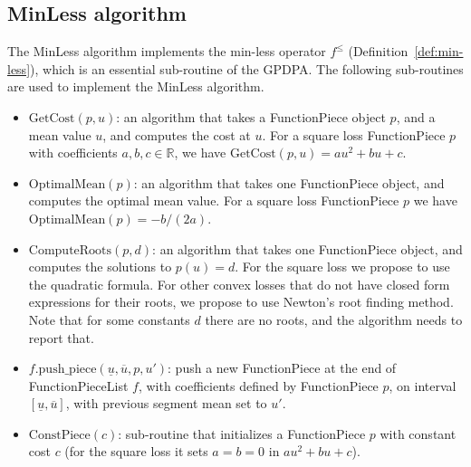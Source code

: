 \documentclass{article}
\newcommand{\RR}{\mathbb R}
\begin{document}
\subsection{MinLess algorithm}
\label{sec:MinLess}
The MinLess algorithm implements the min-less operator $f^\leq$
(Definition~\ref{def:min-less}), which is an essential sub-routine of
the GPDPA. The following sub-routines are used to implement the
MinLess algorithm.

\begin{itemize}
\item $\text{GetCost}(p, u)$: an algorithm that takes a FunctionPiece
  object $p$, and a mean value $u$, and computes the cost at $u$. For
  a square loss FunctionPiece $p$ with coefficients $a,b,c\in\RR$, we
  have $\text{GetCost}(p,u)=au^2+bu+c$.
\item $\text{OptimalMean}(p)$: an algorithm that takes one
  FunctionPiece object, and computes the optimal mean value. For a
  square loss FunctionPiece $p$ we have
  $\text{OptimalMean}(p)=-b/(2a)$.
\item $\text{ComputeRoots}(p, d)$: an algorithm that takes one
  FunctionPiece object, and computes the solutions to $p(u)=d$. For
  the square loss we propose to use the quadratic formula. For other
  convex losses that do not have closed form expressions for their
  roots, we propose to use Newton's root finding method. Note that for
  some constants $d$ there are no roots, and the algorithm needs to
  report that.
\item $f.\text{push\_piece}(\underline u, \overline u, p, u')$: push a
  new FunctionPiece at the end of FunctionPieceList $f$, with
  coefficients defined by FunctionPiece $p$, on interval
  $[\underline u, \overline u]$, with previous segment mean set to
  $u'$.
\item $\text{ConstPiece}(c)$: sub-routine that initializes a
  FunctionPiece $p$ with constant cost $c$ (for the square loss it
  sets $a=b=0$ in $au^2 + bu + c$).
\end{itemize}
\end{document}

